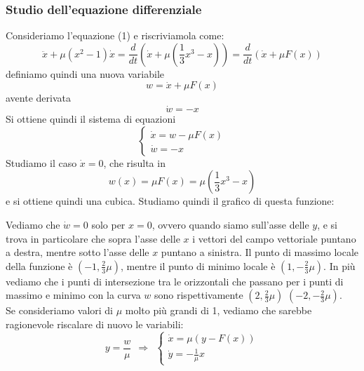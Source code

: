 \documentclass[12pt]{article}
\begin{document}
\subsubsection{Studio dell'equazione differenziale}
Consideriamo l'equazione (1) e riscriviamola come:
\begin{equation}
	\ddot{x}+\mu(x^2-1)\dot{x} = \frac{d}{dt}\left(\dot{x}+\mu\left(\frac{1}{3}x^3-x\right)\right) = \frac{d}{dt}\left(\dot{x} + \mu F(x)\right)
\end{equation}
definiamo quindi una nuova variabile
\begin{equation}
	w = \dot{x} + \mu F(x)
\end{equation}
avente derivata 
$$
	\dot{w} = -x
$$
Si ottiene quindi il sistema di equazioni
\begin{equation}
	\begin{cases}
		\dot{x} = w - \mu F(x) \\
		\dot{w} = -x
	\end{cases}
\end{equation}
Studiamo il caso $\dot{x} = 0$, che risulta in
\begin{equation}
	w(x) = \mu F(x) = \mu\left(\frac{1}{3}x^3-x\right)
\end{equation}
e si ottiene quindi una cubica. Studiamo quindi il grafico di questa funzione: 
\begin{figure}[H]
	\centering
	
\end{figure}
Vediamo che $\dot{w} = 0$ solo per $x=0$, ovvero quando siamo sull'asse delle $y$, e si trova in particolare che sopra l'asse delle $x$ i vettori del campo vettoriale puntano a destra, mentre sotto l'asse delle $x$ puntano a sinistra. Il punto di massimo locale della funzione è $\left(-1,\frac{2}{3}\mu\right)$, mentre il punto di minimo locale è $\left(1,-\frac{2}{3}\mu\right)$. In più vediamo che i punti di intersezione tra le orizzontali che passano per i punti di massimo e minimo con la curva $w$ sono rispettivamente $\left(2,\frac{2}{3}\mu\right)$ $\left(-2,-\frac{2}{3}\mu\right)$. \\
Se consideriamo valori di $\mu$ molto più grandi di 1, vediamo che sarebbe ragionevole riscalare di nuovo le variabili:
\begin{equation}
	y = \frac{w}{\mu} \ \ \Longrightarrow \ \ \begin{cases}
		\dot{x} = \mu(y - F(x)) \\
		\dot{y} = -\frac{1}{\mu}x	
	\end{cases}
\end{equation}
\end{document}
